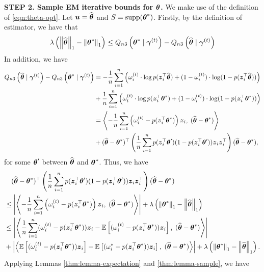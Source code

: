 \medskip
\noindent
\textbf{STEP 2. Sample EM iterative bounds for $\btheta$.} 
We make use of the definition of \eqref{eqn:theta-opt}. 
Let $\bu = \hat\btheta$ and $S = {\rm supp}(\btheta^*)$.
Firstly, by the definition of estimator, we have that 
\begin{equation} \label{eqn:Qn3-diff-lb}
\lambda\paren{\norm{\hat\btheta}_1 - \norm{\btheta^*}_1} 
\le 
Q_{n3}\paren{\btheta^* \cond \bgamma^{(t)}} - Q_{n3}\paren{\hat\btheta \cond \bgamma^{(t)}} 
\end{equation}
In addition, we have
\begin{align}
Q_{n3}\paren{\hat\btheta \cond \bgamma^{(t)}}
- Q_{n3}\paren{{\btheta^*} \cond \bgamma^{(t)}}
& = 
- \frac{1}{n} \sum_{i=1}^{n} \paren{ \omega_i^{(t)} \cdot \log p(\bz_i^\top\hat\btheta) + (1- \omega_i^{(t)}) \cdot \log(1-p(\bz_i^\top\hat\btheta)) } \nonumber\\
& + \frac{1}{n} \sum_{i=1}^{n} \paren{ \omega_i^{(t)} \cdot \log p(\bz_i^\top\btheta^*) + (1- \omega_i^{(t)}) \cdot \log(1-p(\bz_i^\top\btheta^*)) } \nonumber\\
& = \angles{-\frac{1}{n} \sum_{i=1}^{n} \paren{\omega_i^{(t)}- p(\bz_i^\top\btheta^*)}\bz_i, \; (\hat\btheta-\btheta^*) } \nonumber\\
& + (\hat\btheta-\btheta^*)^\top \paren{\frac{1}{n} \sum_{i=1}^{n}p(\bz_i^\top\btheta')(1-p(\bz_i^\top\btheta'))\bz_i\bz_i^\top} (\hat\btheta-\btheta^*), \label{eqn:Qn3-decomp}
\end{align}
for some $\btheta'$ between $\hat\btheta$ and $\btheta^*$. 
Thus, we have
\begin{align*}
&\quad (\hat\btheta-\btheta^*)^\top \paren{\frac{1}{n} \sum_{i=1}^{n}p(\bz_i^\top\btheta')(1-p(\bz_i^\top\btheta'))\bz_i\bz_i^\top} (\hat\btheta-\btheta^*)\\
& \le \abs{\angles{-\frac{1}{n} \sum_{i=1}^{n} \paren{\omega_i^{(t)}- p(\bz_i^\top\btheta^*)}\bz_i, \; (\hat\btheta-\btheta^*) }} + \lambda \paren{\norm{\btheta^*}_1 - \norm{\hat\btheta}_1}  \\
& \le \abs{\angles{\frac{1}{n} \sum_{i=1}^{n} (\omega_i^{(t)}- p(\bz_i^\top\btheta^*))\bz_i - \EE\brackets{(\omega_i^{(t)}- p(\bz_i^\top\btheta^*))\bz_i}, \; (\hat\btheta-\btheta^*) }} \\
& + \abs{\angles{\EE\brackets{(\omega_i^{(t)}- p(\bz_i^\top\btheta^*))\bz_i} - \EE\brackets{(\omega_i^*- p(\bz_i^\top\btheta^*))\bz_i}, \; (\hat\btheta-\btheta^*) }}  + \lambda \paren{\norm{\btheta^*}_1 - \norm{\hat\btheta}_1} . 
\end{align*}
Applying Lemmas \ref{thm:lemma-expectation} and \ref{thm:lemma-sample}, we have
